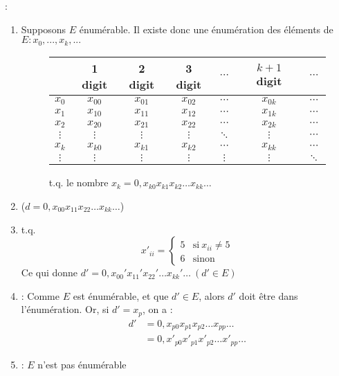  :
\begin{enumerate}
\item Supposons $E$ énumérable. Il existe donc une énumération des éléments de $E : x_0, ..., x_k, ...$
\begin{figure}[H]
    	\centering
    	\begin{tabular}{c|cccccc}
	 & 1 digit & 2 digit & 3 digit & $\cdots$ & $k+1$ digit & $\cdots$ \\ 
	\hline 
	$x_0$ & $x_{00}$ & $x_{01}$ & $x_{02}$ & $\cdots$ & $x_{0k}$ & $\cdots$ \\ 
	$x_1$ & $x_{10}$ & $x_{11}$ & $x_{12}$ & $\cdots$ & $x_{1k}$ & $\cdots$ \\ 
	$x_2$ & $x_{20}$ & $x_{21}$ & $x_{22}$ & $\cdots$ & $x_{2k}$ & $\cdots$ \\ 
	$\vdots$ & $\vdots$ & $\vdots$ & $\vdots$ & $\ddots$ & $\vdots$ & $\cdots$ \\ 
	$x_k$ & $x_{k0}$ & $x_{k1}$ & $x_{k2}$ & $\cdots$ & $x_{kk}$ & $\cdots$ \\ 
	$\vdots$ & $\vdots$ & $\vdots$ & $\vdots$ & $\vdots$ & $\vdots$ & $\ddots$ \\ 
	\end{tabular}
	\caption{ t.q. le nombre $x_k = 0,x_{k0} x_{k1} x_{k2} \ldots x_{kk} \ldots$}
\end{figure}
\item {} ($d = 0,x_{00} x_{11} x_{22} \ldots x_{kk} \ldots$)
\item {} t.q.
\begin{equation*}
	x'_{ii}=
	\begin{cases}
      	5 & \text{si}\ x_{ii} \neq 5 \\
      	6 & \text{sinon}
    \end{cases}
\end{equation*}
Ce qui donne $d' =  0,x_{00}' x_{11}' x_{22}' \ldots x_{kk}' \ldots \ (d' \in E)$
\item {} : Comme $E$ est énumérable, et que $d' \in E$, alors $d'$ doit être dans l'énumération. Or, si $d' = x_p$, on a :
\begin{align*}
	d' &= 0,x_{p0} x_{p1} x_{p2} \ldots x_{pp} \ldots\\
	   &= 0,x'_{p0} x'_{p1} x'_{p2} \ldots x'_{pp} \ldots
\end{align*}
\item {} : $E$ n'est pas énumérable
\end{enumerate}

